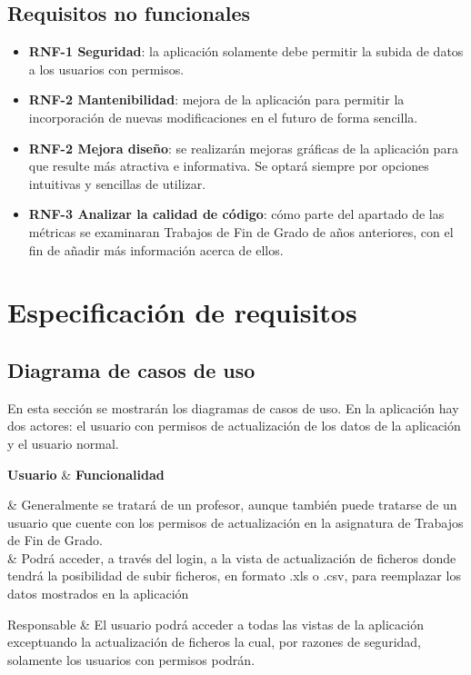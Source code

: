 \subsection{Requisitos no funcionales}
\begin{itemize}
	\item \textbf{RNF-1 Seguridad}: la aplicación solamente debe permitir la subida de datos a los usuarios con permisos.
	
	\item \textbf{RNF-2 Mantenibilidad}: mejora de la aplicación para permitir la incorporación de nuevas modificaciones en el futuro de forma sencilla. 
	
	\item \textbf{RNF-2 Mejora diseño}: se realizarán mejoras gráficas de la aplicación para que resulte más atractiva e informativa. Se optará siempre por opciones intuitivas y sencillas de utilizar.
	
	\item \textbf{RNF-3 Analizar la calidad de código}: cómo parte del apartado de las métricas se examinaran Trabajos de Fin de Grado de años anteriores, con el fin de añadir más información acerca de ellos.

\end{itemize}

\section{Especificación de requisitos}

\subsection{Diagrama de casos de uso}
En esta sección se mostrarán los diagramas de casos de uso. En la aplicación hay dos actores: el usuario con permisos de actualización de los datos de la aplicación y el usuario normal.

{\textbf{Usuario} & \textbf{Funcionalidad} \\}{
	& Generalmente se tratará de un profesor, aunque también puede tratarse de un usuario que cuente con los permisos de actualización en la asignatura de Trabajos de Fin de Grado. \\
	& Podrá acceder, a través del login, a la vista de actualización de ficheros donde tendrá la posibilidad de subir ficheros, en formato .xls o .csv, para reemplazar los datos mostrados en la aplicación \\ \hline
	
	Responsable & El usuario podrá acceder a todas las vistas de la aplicación exceptuando la actualización de ficheros la cual, por razones de seguridad, solamente los usuarios con permisos podrán. \\
}


